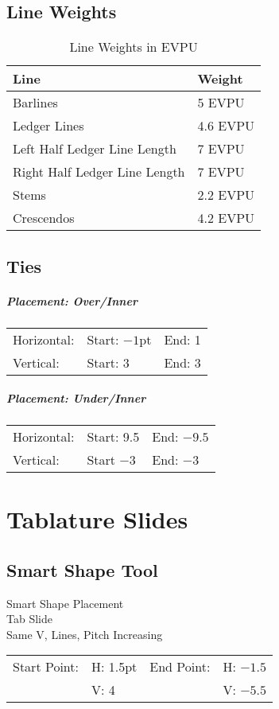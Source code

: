 \documentclass[unicode,hyperfootnotes=false,xetex,colorlinks=true,nofonts,nobib]{tufte-book} %
\begin{document}
\section{Line Weights}
\begin{table}
  \begin{center}
\begin{tabular}[h!]{l l}
  Line & Weight\\\hline
  Barlines & 5 EVPU\\
  Ledger Lines & 4.6 EVPU\\
  Left Half Ledger Line Length & 7 EVPU\\
  Right Half Ledger Line Length & 7 EVPU\\
  Stems & 2.2 EVPU\\
  Crescendos & 4.2 EVPU\\
\end{tabular}
\end{center}
\caption{Line Weights in EVPU}
\end{table}
\section{Ties}
\paragraph{Placement: Over/Inner}
\begin{tabular}{l l l}
Horizontal: & Start: $-1$pt & End: 1\\
Vertical: & Start: 3 & End: 3\\
\end{tabular}
\paragraph{Placement: Under/Inner}
\begin{tabular}{l l l}
Horizontal: & Start: 9.5 & End: $-9.5$\\
Vertical: & Start $-3$ & End: $-3$
\end{tabular}
\chapter{Tablature Slides}
\section{Smart Shape Tool}
Smart Shape Placement\\
Tab Slide\\
Same V, Lines, Pitch Increasing\\
\begin{tabular}{l l l l}
Start Point: & H: 1.5pt & End Point: & H: $-1.5$\\
& V: 4 & & V: $-5.5$\\
\end{tabular}
\end{document}
